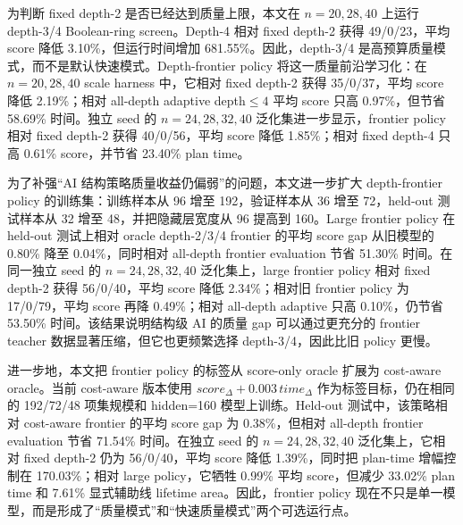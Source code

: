 \documentclass[UTF8,fontset=macnew,11pt]{ctexart}
\newcommand{\screen}{Boolean-ring screen}
\begin{document}
为判断 fixed depth-2 是否已经达到质量上限，本文在 $n=20,28,40$ 上运行 depth-3/4 \screen{}。Depth-4 相对 fixed depth-2 获得 49/0/23，平均 score 降低 3.10\%，但运行时间增加 681.55\%。因此，depth-3/4 是高预算质量模式，而不是默认快速模式。Depth-frontier policy 将这一质量前沿学习化：在 $n=20,28,40$ scale harness 中，它相对 fixed depth-2 获得 35/0/37，平均 score 降低 2.19\%；相对 all-depth adaptive depth$\leq4$ 平均 score 只高 0.97\%，但节省 58.69\% 时间。独立 seed 的 $n=24,28,32,40$ 泛化集进一步显示，frontier policy 相对 fixed depth-2 获得 40/0/56，平均 score 降低 1.85\%；相对 fixed depth-4 只高 0.61\% score，并节省 23.40\% plan time。

为了补强“AI 结构策略质量收益仍偏弱”的问题，本文进一步扩大 depth-frontier policy 的训练集：训练样本从 96 增至 192，验证样本从 36 增至 72，held-out 测试样本从 32 增至 48，并把隐藏层宽度从 96 提高到 160。Large frontier policy 在 held-out 测试上相对 oracle depth-2/3/4 frontier 的平均 score gap 从旧模型的 0.80\% 降至 0.04\%，同时相对 all-depth frontier evaluation 节省 51.30\% 时间。在同一独立 seed 的 $n=24,28,32,40$ 泛化集上，large frontier policy 相对 fixed depth-2 获得 56/0/40，平均 score 降低 2.34\%；相对旧 frontier policy 为 17/0/79，平均 score 再降 0.49\%；相对 all-depth adaptive 只高 0.10\%，仍节省 53.50\% 时间。该结果说明结构级 AI 的质量 gap 可以通过更充分的 frontier teacher 数据显著压缩，但它也更频繁选择 depth-3/4，因此比旧 policy 更慢。

进一步地，本文把 frontier policy 的标签从 score-only oracle 扩展为 cost-aware oracle。当前 cost-aware 版本使用 $score_{\Delta}+0.003\,time_{\Delta}$ 作为标签目标，仍在相同的 192/72/48 项集规模和 hidden=160 模型上训练。Held-out 测试中，该策略相对 cost-aware frontier 的平均 score gap 为 0.38\%，但相对 all-depth frontier evaluation 节省 71.54\% 时间。在独立 seed 的 $n=24,28,32,40$ 泛化集上，它相对 fixed depth-2 仍为 56/0/40，平均 score 降低 1.39\%，同时把 plan-time 增幅控制在 170.03\%；相对 large policy，它牺牲 0.99\% 平均 score，但减少 33.02\% plan time 和 7.61\% 显式辅助线 lifetime area。因此，frontier policy 现在不只是单一模型，而是形成了“质量模式”和“快速质量模式”两个可选运行点。
\end{document}

